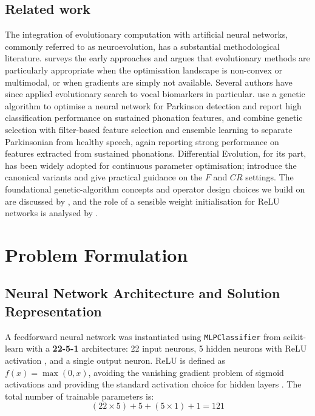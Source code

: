 \documentclass[12pt, a4paper]{article}
\begin{document}
\subsection*{Related work}
The integration of evolutionary computation with artificial neural networks, commonly referred to as neuroevolution, has a substantial methodological literature. \citet{yao1999} surveys the early approaches and argues that evolutionary methods are particularly appropriate when the optimisation landscape is non-convex or multimodal, or when gradients are simply not available. Several authors have since applied evolutionary search to vocal biomarkers in particular. \citet{ali2019} use a genetic algorithm to optimise a neural network for Parkinson detection and report high classification performance on sustained phonation features, and \citet{ali2023} combine genetic selection with filter-based feature selection and ensemble learning to separate Parkinsonian from healthy speech, again reporting strong performance on features extracted from sustained phonations. Differential Evolution, for its part, has been widely adopted for continuous parameter optimisation; \citet{storn1997} introduce the canonical variants and give practical guidance on the $F$ and $CR$ settings. The foundational genetic-algorithm concepts and operator design choices we build on are discussed by \citet{goldberg1989}, and the role of a sensible weight initialisation for ReLU networks is analysed by \citet{he2015}.

\section{Problem Formulation}

\subsection{Neural Network Architecture and Solution Representation}

A feedforward neural network was instantiated using \texttt{MLPClassifier} from scikit-learn with a \textbf{22-5-1} architecture: 22 input neurons, 5 hidden neurons with ReLU activation \cite{nair2010}, and a single output neuron. ReLU is defined as $f(x) = \max(0,x)$, avoiding the vanishing gradient problem of sigmoid activations and providing the standard activation choice for hidden layers \cite{he2015}. The total number of trainable parameters is:
\[
(22 \times 5) + 5 + (5 \times 1) + 1 = 121
\]
\end{document}
